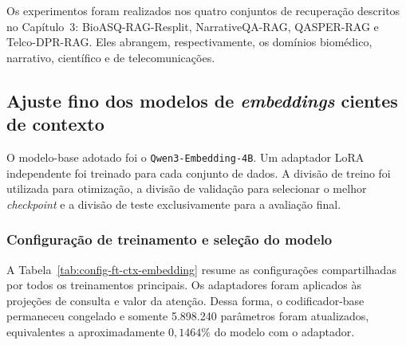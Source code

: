 Os experimentos foram realizados nos quatro conjuntos de recuperação descritos no Capítulo~3: BioASQ-RAG-Resplit, NarrativeQA-RAG, QASPER-RAG e Telco-DPR-RAG. Eles abrangem, respectivamente, os domínios biomédico, narrativo, científico e de telecomunicações.

\subsection{Ajuste fino dos modelos de \textit{embeddings} cientes de contexto}
\label{subsec:ctx-emb-ajuste}

O modelo-base adotado foi o \texttt{Qwen3-Embedding-4B}. Um adaptador LoRA independente foi treinado para cada conjunto de dados. A divisão de treino foi utilizada para otimização, a divisão de validação para selecionar o melhor \textit{checkpoint} e a divisão de teste exclusivamente para a avaliação final.

\subsubsection{Configuração de treinamento e seleção do modelo}
\label{subsubsec:ctx-emb-configuracao}

A Tabela~\ref{tab:config-ft-ctx-embedding} resume as configurações compartilhadas por todos os treinamentos principais. Os adaptadores foram aplicados às projeções de consulta e valor da atenção. Dessa forma, o codificador-base permaneceu congelado e somente 5.898.240 parâmetros foram atualizados, equivalentes a aproximadamente $0{,}1464\%$ do modelo com o adaptador.

